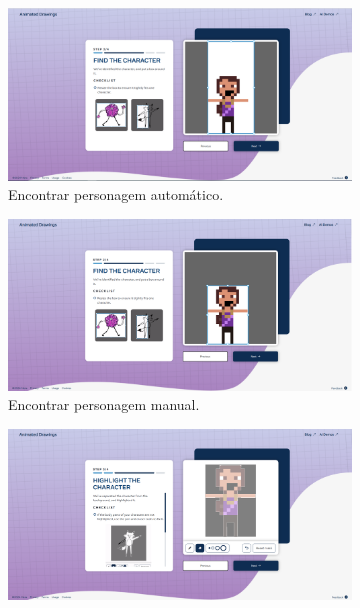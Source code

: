 \begin{figure}[htbp]
    \centering
    \caption{\small Processo da utilização 3 do Animated Drawnings}
    \label{fig:sketch3}
    \begin{subfigure}{0.45\linewidth}
        \includegraphics[width=1\linewidth]{figs/sketchLab/3tela1.PNG}
        \caption{\small Encontrar personagem automático.}
        \label{fig:sketch3a}
    \end{subfigure}
    \begin{subfigure}{0.45\linewidth}
        \centering
        \includegraphics[width=1\linewidth]{figs/sketchLab/3tela2.PNG}
        \caption{\small Encontrar personagem manual.}
        \label{fig:sketch3b}
    \end{subfigure}
    \begin{subfigure}{0.6\linewidth}
        \centering
        \includegraphics[width=1\linewidth]{figs/sketchLab/3tela3.PNG}

\end{subfigure}
\end{figure}
